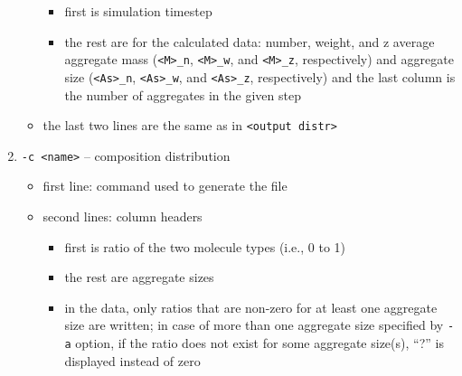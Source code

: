 \begin{enumerate}[nosep,leftmargin=20pt]
\begin{itemize}[nosep,leftmargin=5pt]
\begin{itemize}[nosep,leftmargin=10pt]
        \item first is simulation timestep
        \item the rest are for the calculated data: number, weight, and z
          average aggregate mass (\texttt{<M>\_n}, \texttt{<M>\_w}, and
          \texttt{<M>\_z}, respectively) and aggregate size
          (\texttt{<As>\_n}, \texttt{<As>\_w}, and \texttt{<As>\_z},
          respectively) and the last column is the number of aggregates in
          the given step
      \end{itemize}
    \item the last two lines are the same as in \texttt{<output distr>}
  \end{itemize}
\item \texttt{-c <name>} -- composition distribution
  \begin{itemize}[nosep,leftmargin=5pt]
    \item first line: command used to generate the file
    \item second lines: column headers
      \begin{itemize}[nosep,leftmargin=10pt]
        \item first is ratio of the two molecule types (i.e., 0 to 1)
        \item the rest are aggregate sizes
        \item in the data, only ratios that are non-zero for at least one
          aggregate size are written; in case of more than one aggregate
          size specified by \texttt{-a} option, if the ratio does not exist
          for some aggregate size(s), \enquote{?} is displayed instead of zero
      \end{itemize}
  \end{itemize}
\end{enumerate}
